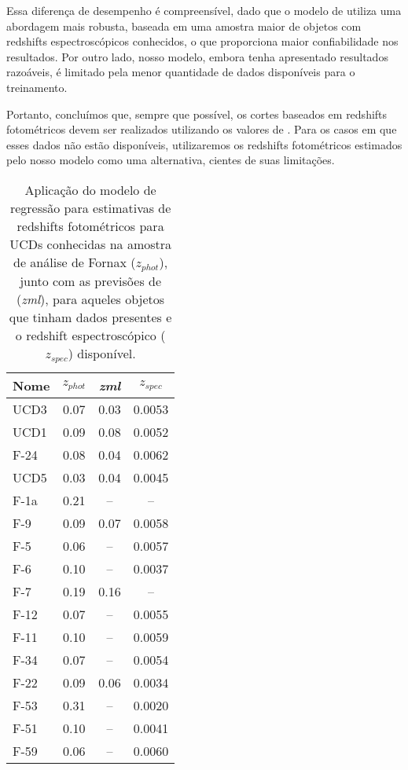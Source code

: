 Essa diferença de desempenho é compreensível, dado que o modelo de \cite{erik_photoz_2024} utiliza uma abordagem mais robusta, baseada em uma amostra maior de objetos com redshifts espectroscópicos conhecidos, o que proporciona maior confiabilidade nos resultados. Por outro lado, nosso modelo, embora tenha apresentado resultados razoáveis, é limitado pela menor quantidade de dados disponíveis para o treinamento.

Portanto, concluímos que, sempre que possível, os cortes baseados em redshifts fotométricos devem ser realizados utilizando os valores de \cite{erik_photoz_2024}. Para os casos em que esses dados não estão disponíveis, utilizaremos os redshifts fotométricos estimados pelo nosso modelo como uma alternativa, cientes de suas limitações.

\begin{table}[!ht]
    \centering
    \caption{Aplicação do modelo de regressão para estimativas de redshifts fotométricos para UCDs conhecidas na amostra de análise de Fornax (\textit{$z_{phot}$}), junto com as previsões de \citep{erik_photoz_2024} (\textit{zml}), para aqueles objetos que tinham dados presentes e o redshift espectroscópico (\textit{$z_{spec}$}) disponível.}
    \begin{tabular}{lccc}
        \toprule
        Nome & \textit{$z_{phot}$} & \textit{zml} & \textit{$z_{spec}$}\\
        \midrule
        UCD3 & 0.07 & 0.03 & 0.0053\\
        UCD1 & 0.09 & 0.08 & 0.0052\\
        F-24 & 0.08 & 0.04 & 0.0062\\
        UCD5 & 0.03 & 0.04 & 0.0045\\
        F-1a & 0.21 & -- & --\\
        F-9 & 0.09 & 0.07 & 0.0058\\
        F-5 & 0.06 & -- & 0.0057\\
        F-6 & 0.10 & -- & 0.0037\\
        F-7 & 0.19 & 0.16 & --\\
        F-12 & 0.07 & -- & 0.0055\\
        F-11 & 0.10 & -- & 0.0059\\
        F-34 & 0.07 & -- & 0.0054\\ 
        F-22 & 0.09 & 0.06 & 0.0034\\
        F-53 & 0.31 & -- & 0.0020\\
        F-51 & 0.10 & -- & 0.0041\\
        F-59 & 0.06 & -- & 0.0060\\
        \midrule
    \end{tabular}
    \label{ucds_zphot}
\end{table}

